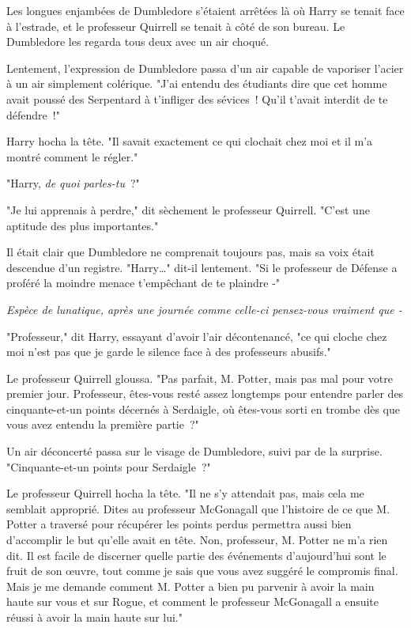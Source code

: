 Les longues enjambées de Dumbledore s'étaient arrêtées là où Harry se tenait face à l'estrade, et le professeur Quirrell se tenait à côté de son bureau. Le Dumbledore les regarda tous deux avec un air choqué.

Lentement, l'expression de Dumbledore passa d'un air capable de vaporiser l'acier à un air simplement colérique. "J'ai entendu des étudiants dire que cet homme avait poussé des Serpentard à t'infliger des sévices~! Qu'il t'avait interdit de te défendre~!"

Harry hocha la tête. "Il savait exactement ce qui clochait chez moi et il m'a montré comment le régler."

"Harry, \emph{de quoi parles-tu}~?"

"Je lui apprenais à perdre," dit sèchement le professeur Quirrell. "C'est une aptitude des plus importantes."

Il était clair que Dumbledore ne comprenait toujours pas, mais sa voix était descendue d'un registre. "Harry…" dit-il lentement. "Si le professeur de Défense a proféré la moindre menace t'empêchant de te plaindre -"

\emph{Espèce de lunatique, après une journée comme celle-ci pensez-vous vraiment que -}

"Professeur," dit Harry, essayant d'avoir l'air décontenancé, "ce qui cloche chez moi n'est pas que je garde le silence face à des professeurs abusifs."

Le professeur Quirrell gloussa. "Pas parfait, M. Potter, mais pas mal pour votre premier jour. Professeur, êtes-vous resté assez longtemps pour entendre parler des cinquante-et-un points décernés à Serdaigle, où êtes-vous sorti en trombe dès que vous avez entendu la première partie~?"

Un air déconcerté passa sur le visage de Dumbledore, suivi par de la surprise. "Cinquante-et-un points pour Serdaigle~?"

Le professeur Quirrell hocha la tête. "Il ne s'y attendait pas, mais cela me semblait approprié. Dites au professeur McGonagall que l'histoire de ce que M. Potter a traversé pour récupérer les points perdus permettra aussi bien d'accomplir le but qu'elle avait en tête. Non, professeur, M. Potter ne m'a rien dit. Il est facile de discerner quelle partie des événements d'aujourd'hui sont le fruit de son œuvre, tout comme je sais que vous avez suggéré le compromis final. Mais je me demande comment M. Potter a bien pu parvenir à avoir la main haute sur vous et sur Rogue, et comment le professeur McGonagall a ensuite réussi à avoir la main haute sur lui."

